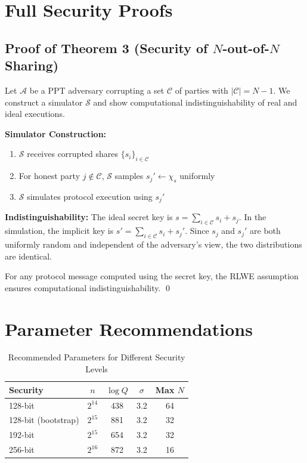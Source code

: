 \documentclass[11pt,a4paper]{article}
\begin{document}
\appendix

\section{Full Security Proofs}

\subsection{Proof of Theorem 3 (Security of $N$-out-of-$N$ Sharing)}

Let $\mathcal{A}$ be a PPT adversary corrupting a set $\mathcal{C}$ of parties with $|\mathcal{C}| = N-1$. We construct a simulator $\mathcal{S}$ and show computational indistinguishability of real and ideal executions.

\textbf{Simulator Construction:}
\begin{enumerate}
    \item $\mathcal{S}$ receives corrupted shares $\{s_i\}_{i \in \mathcal{C}}$
    \item For honest party $j \notin \mathcal{C}$, $\mathcal{S}$ samples $s_j' \leftarrow \chi_s$ uniformly
    \item $\mathcal{S}$ simulates protocol execution using $s_j'$
\end{enumerate}

\textbf{Indistinguishability:}
The ideal secret key is $s = \sum_{i \in \mathcal{C}} s_i + s_j$. In the simulation, the implicit key is $s' = \sum_{i \in \mathcal{C}} s_i + s_j'$. Since $s_j$ and $s_j'$ are both uniformly random and independent of the adversary's view, the two distributions are identical.

For any protocol message computed using the secret key, the RLWE assumption ensures computational indistinguishability. \qed

\section{Parameter Recommendations}

\begin{table}[h]
\centering
\caption{Recommended Parameters for Different Security Levels}
\begin{tabular}{@{}lcccc@{}}
\toprule
Security & $n$ & $\log Q$ & $\sigma$ & Max $N$ \\
\midrule
128-bit & $2^{14}$ & 438 & 3.2 & 64 \\
128-bit (bootstrap) & $2^{15}$ & 881 & 3.2 & 32 \\
192-bit & $2^{15}$ & 654 & 3.2 & 32 \\
256-bit & $2^{16}$ & 872 & 3.2 & 16 \\
\bottomrule
\end{tabular}
\end{table}
\end{document}
